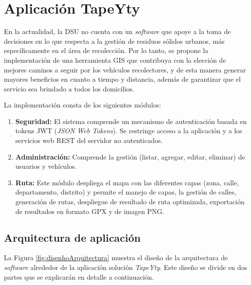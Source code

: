 \chapter{Aplicación TapeYty}
\label{solucionpropuesta}
\ifpdf
  \graphicspath{{Chapter6/Chapter6Figs/PNG/}{Chapter6/Chapter6Figs/PDF/}{Chapter6/Chapter6Figs/}}
\else
  \graphicspath{{Chapter6/Chapter6Figs/EPS/}{Chapter6/Chapter6Figs/}}
\fi


En la actualidad, la DSU no cuenta con un \textit{software} que apoye a la toma de decisiones en lo que respecta a la gestión de residuos sólidos urbanos, más específicamente en el área de recolección. Por lo tanto, se propone la implementación de una herramienta GIS que contribuya con la elección de mejores caminos a seguir por los vehículos recolectores, y de esta manera generar mayores beneficios en cuanto a tiempo y distancia, además de garantizar que el servicio sea brindado a todos los domicilios.

La implementación consta de los siguientes módulos:
\begin{enumerate}
    \item \textbf{Seguridad:} El sistema comprende un mecanismo de autenticación basada en tokens JWT (\textit{JSON Web Tokens}). Se restringe acceso a la aplicación y a los servicios web REST del servidor no autenticados.
    \item \textbf{Administración:} Comprende la gestión (listar, agregar, editar, eliminar) de usuarios y vehículos.
    \item \textbf{Ruta:} Este módulo despliega el mapa con las diferentes capas (zona, calle, departamento, distrito) y permite el manejo de capas, la gestión de calles, generación de rutas, despliegue de resultado de ruta optimizada, exportación de resultados en formato GPX y de imagen PNG.
\end{enumerate}

\section{Arquitectura de aplicación}

La Figura \ref{fig:disenhoArquitectura} muestra el diseño de la arquitectura de \textit{software} alrededor de la aplicación solución \textit{TapeYty}. Este diseño se divide en dos partes que se explicarán en detalle a continuación.

